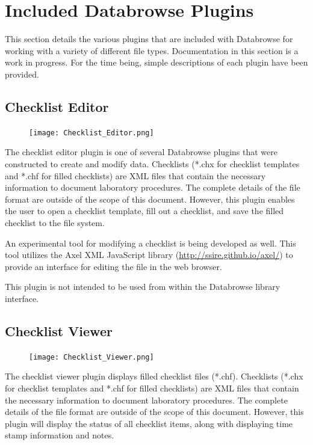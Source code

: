 \documentclass[10pt]{article}
\begin{document}
\clearpage
\section{Included Databrowse Plugins}

This section details the various plugins that are included with Databrowse for working with a variety of different file types.  Documentation in this section is a work in progress.  For the time being, simple descriptions of each plugin have been provided.

\begingroup
\setlength\intextsep{0pt}
\subsection{Checklist Editor}
\begin{figure}
		\texttt{[image: Checklist\_Editor.png]}
\end{figure}
The checklist editor plugin is one of several Databrowse plugins that were constructed to create and modify data.  Checklists (*.chx for checklist templates and *.chf for filled checklists) are XML files that contain the necessary information to document laboratory procedures.  The complete details of the file format are outside of the scope of this document.  However, this plugin enables the user to open a checklist template, fill out a checklist, and save the filled checklist to the file system.

An experimental tool for modifying a checklist is being developed as well.  This tool utilizes the Axel XML JavaScript library (\url{http://ssire.github.io/axel/}) to provide an interface for editing the file in the web browser.

This plugin is not intended to be used from within the Databrowse library interface.

\endgroup

\hfill\break

\begingroup
\setlength\intextsep{0pt}
\subsection{Checklist Viewer}
\begin{figure}
		\texttt{[image: Checklist\_Viewer.png]}
\end{figure}
The checklist viewer plugin displays filled checklist files (*.chf).  Checklists (*.chx for checklist templates and *.chf for filled checklists) are XML files that contain the necessary information to document laboratory procedures.  The complete details of the file format are outside of the scope of this document.  However, this plugin will display the status of all checklist items, along with displaying time stamp information and notes.
\end{document}
